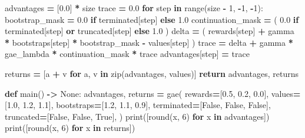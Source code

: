 \documentclass[
  chinese,
  11pt,
  letterpaper,
]{article}
\newenvironment{Shaded}{\begin{snugshade}}{\end{snugshade}}
\newcommand{\BuiltInTok}[1]{#1}
\newcommand{\ControlFlowTok}[1]{\textcolor[rgb]{0.13,0.29,0.53}{\textbf{#1}}}
\newcommand{\DecValTok}[1]{\textcolor[rgb]{0.00,0.00,0.81}{#1}}
\newcommand{\FloatTok}[1]{\textcolor[rgb]{0.00,0.00,0.81}{#1}}
\newcommand{\KeywordTok}[1]{\textcolor[rgb]{0.13,0.29,0.53}{\textbf{#1}}}
\newcommand{\NormalTok}[1]{#1}
\newcommand{\OperatorTok}[1]{\textcolor[rgb]{0.81,0.36,0.00}{\textbf{#1}}}
\newcommand{\VariableTok}[1]{\textcolor[rgb]{0.00,0.00,0.00}{#1}}
\renewenvironment{Shaded}{\par\smallskip}{\par\smallskip}
\begin{document}
\begin{Shaded}
\begin{Highlighting}[]
\NormalTok{    advantages }\OperatorTok{=}\NormalTok{ [}\FloatTok{0.0}\NormalTok{] }\OperatorTok{*}\NormalTok{ size}
\NormalTok{    trace }\OperatorTok{=} \FloatTok{0.0}
    \ControlFlowTok{for}\NormalTok{ step }\KeywordTok{in} \BuiltInTok{range}\NormalTok{(size }\OperatorTok{{-}} \DecValTok{1}\NormalTok{, }\OperatorTok{{-}}\DecValTok{1}\NormalTok{, }\OperatorTok{{-}}\DecValTok{1}\NormalTok{):}
\NormalTok{        bootstrap\_mask }\OperatorTok{=} \FloatTok{0.0} \ControlFlowTok{if}\NormalTok{ terminated[step] }\ControlFlowTok{else} \FloatTok{1.0}
\NormalTok{        continuation\_mask }\OperatorTok{=}\NormalTok{ (}
            \FloatTok{0.0} \ControlFlowTok{if}\NormalTok{ terminated[step] }\KeywordTok{or}\NormalTok{ truncated[step] }\ControlFlowTok{else} \FloatTok{1.0}
\NormalTok{        )}
\NormalTok{        delta }\OperatorTok{=}\NormalTok{ (}
\NormalTok{            rewards[step]}
            \OperatorTok{+}\NormalTok{ gamma }\OperatorTok{*}\NormalTok{ bootstraps[step] }\OperatorTok{*}\NormalTok{ bootstrap\_mask}
            \OperatorTok{{-}}\NormalTok{ values[step]}
\NormalTok{        )}
\NormalTok{        trace }\OperatorTok{=}\NormalTok{ delta }\OperatorTok{+}\NormalTok{ gamma }\OperatorTok{*}\NormalTok{ gae\_lambda }\OperatorTok{*}\NormalTok{ continuation\_mask }\OperatorTok{*}\NormalTok{ trace}
\NormalTok{        advantages[step] }\OperatorTok{=}\NormalTok{ trace}

\NormalTok{    returns }\OperatorTok{=}\NormalTok{ [a }\OperatorTok{+}\NormalTok{ v }\ControlFlowTok{for}\NormalTok{ a, v }\KeywordTok{in} \BuiltInTok{zip}\NormalTok{(advantages, values)]}
    \ControlFlowTok{return}\NormalTok{ advantages, returns}


\KeywordTok{def}\NormalTok{ main() }\OperatorTok{{-}\textgreater{}} \VariableTok{None}\NormalTok{:}
\NormalTok{    advantages, returns }\OperatorTok{=}\NormalTok{ gae(}
\NormalTok{        rewards}\OperatorTok{=}\NormalTok{[}\FloatTok{0.5}\NormalTok{, }\FloatTok{0.2}\NormalTok{, }\FloatTok{0.0}\NormalTok{],}
\NormalTok{        values}\OperatorTok{=}\NormalTok{[}\FloatTok{1.0}\NormalTok{, }\FloatTok{1.2}\NormalTok{, }\FloatTok{1.1}\NormalTok{],}
\NormalTok{        bootstraps}\OperatorTok{=}\NormalTok{[}\FloatTok{1.2}\NormalTok{, }\FloatTok{1.1}\NormalTok{, }\FloatTok{0.9}\NormalTok{],}
\NormalTok{        terminated}\OperatorTok{=}\NormalTok{[}\VariableTok{False}\NormalTok{, }\VariableTok{False}\NormalTok{, }\VariableTok{False}\NormalTok{],}
\NormalTok{        truncated}\OperatorTok{=}\NormalTok{[}\VariableTok{False}\NormalTok{, }\VariableTok{False}\NormalTok{, }\VariableTok{True}\NormalTok{],}
\NormalTok{    )}
    \BuiltInTok{print}\NormalTok{([}\BuiltInTok{round}\NormalTok{(x, }\DecValTok{6}\NormalTok{) }\ControlFlowTok{for}\NormalTok{ x }\KeywordTok{in}\NormalTok{ advantages])}
    \BuiltInTok{print}\NormalTok{([}\BuiltInTok{round}\NormalTok{(x, }\DecValTok{6}\NormalTok{) }\ControlFlowTok{for}\NormalTok{ x }\KeywordTok{in}\NormalTok{ returns])}


\end{Highlighting}
\end{Shaded}
\end{document}
